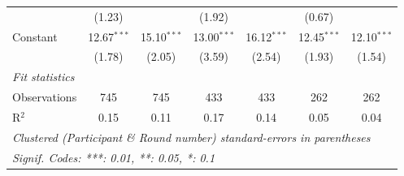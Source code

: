 \begin{tabular}{lcccccc}
                                     & (1.23)        &               & (1.92)        &               & (0.67)        &   \\   
   Constant                          & 12.67$^{***}$ & 15.10$^{***}$ & 13.00$^{***}$ & 16.12$^{***}$ & 12.45$^{***}$ & 12.10$^{***}$\\   
                                     & (1.78)        & (2.05)        & (3.59)        & (2.54)        & (1.93)        & (1.54)\\   
   \midrule
   \emph{Fit statistics}\\
   Observations                      & 745           & 745           & 433           & 433           & 262           & 262\\  
   R$^2$                             & 0.15          & 0.11          & 0.17          & 0.14          & 0.05          & 0.04\\  
   \midrule \midrule
   \multicolumn{7}{l}{\emph{Clustered (Participant \& Round number) standard-errors in parentheses}}\\
   \multicolumn{7}{l}{\emph{Signif. Codes: ***: 0.01, **: 0.05, *: 0.1}}\\
\end{tabular}
\par\endgroup
